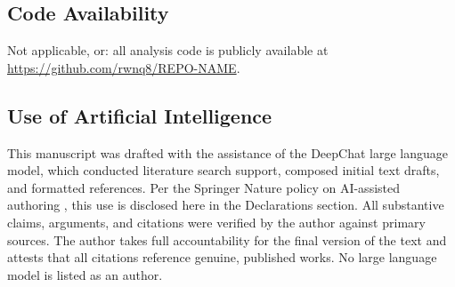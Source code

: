 \documentclass[pdflatex,sn-mathphys-num]{sn-jnl}%
\theoremstyle{thmstyleone}%
\theoremstyle{thmstyletwo}%
\theoremstyle{thmstylethree}%
\begin{document}
\subsection*{Code Availability}
Not applicable, or: all analysis code is publicly available at \url{https://github.com/rwnq8/REPO-NAME}.

\subsection*{Use of Artificial Intelligence}
This manuscript was drafted with the assistance of the DeepChat large language
model, which conducted literature search support, composed initial text
drafts, and formatted references. Per the Springer Nature policy on
AI-assisted authoring \cite{SpringerAI2024}, this use is disclosed here in the
Declarations section. All substantive claims, arguments, and citations were
verified by the author against primary sources. The author takes full
accountability for the final version of the text and attests that all
citations reference genuine, published works. No large language model is
listed as an author.


\end{document}
